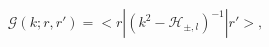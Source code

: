 \begin{equation}
\label{Eq_0207}
\mathcal{G}(k;r,r') = <r|(k^2 - \mathcal{H}_{\pm,l})^{-1}|r'>,
\end{equation}

